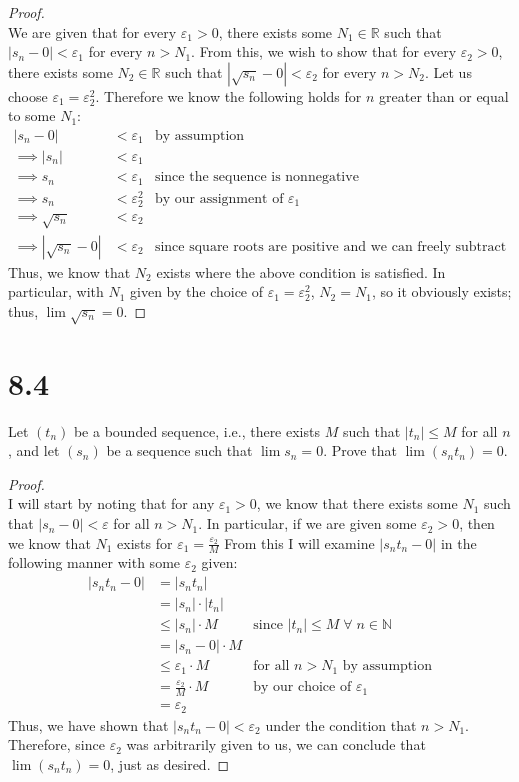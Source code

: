\documentclass[10pt,a4paper]{article}
\theoremstyle{definition}
\begin{document}
\begin{proof}{$ $}
\\We are given that for every $\varepsilon_1 > 0$, there exists some $N_1 \in \mathbb{R}$ such that $|s_n - 0| < \varepsilon_1$ for every $n > N_1$. From this, we wish to show that for every $\varepsilon_2 > 0$, there exists some $N_2 \in \mathbb{R}$ such that  $|\sqrt{s_n} - 0| < \varepsilon_2$ for every $n > N_2$. Let us choose $\varepsilon_1 = \varepsilon_2^2$. Therefore we know the following holds for $n$ greater than or equal to some $N_1$:
\begin{align*}
|s_n - 0| &< \varepsilon_1 &\text{by assumption}\\
\implies |s_n| &< \varepsilon_1\\
\implies s_n &< \varepsilon_1 &\text{since the sequence is nonnegative}\\
\implies s_n &< \varepsilon_2^2 &\text{by our assignment of } \varepsilon_1\\
\implies \sqrt{s_n} &< \varepsilon_2 \\
\implies |\sqrt{s_n} - 0| &< \varepsilon_2 &\text{since square roots are positive and we can freely subtract 0}
\end{align*}
Thus, we know that $N_2$ exists where the above condition is satisfied. In particular, with $N_1$ given by the choice of $\varepsilon_1 = \varepsilon_2^2$, $N_2 = N_1$, so it obviously exists; thus, $\lim \sqrt{s_n} = 0$.
\end{proof}

\section*{8.4}
Let $(t_n)$ be a bounded sequence, i.e., there exists $M$ such that $|t_n| \leq M$ for all $n$, and let $(s_n)$ be a sequence such that $\lim s_n = 0$. Prove that $\lim(s_n t_n) = 0$.

\begin{proof}{$ $}
\\I will start by noting that for any $\varepsilon_1 > 0$, we know that there exists some $N_1$ such that $|s_n - 0| < \varepsilon$ for all $n > N_1$. In particular, if we are given some $\varepsilon_2 > 0$, then we know that $N_1$ exists for $\displaystyle \varepsilon_1 = \frac{\varepsilon_2}{M}$ From this I will examine $|s_nt_n - 0|$ in the following manner with some $\varepsilon_2$ given:
\begin{align*}
|s_nt_n - 0| &= |s_nt_n|\\
&= |s_n|\cdot |t_n|\\
&\leq |s_n| \cdot M &\text{since } |t_n| \leq M \; \forall \; n \in \mathbb{N}\\
&= |s_n - 0| \cdot M\\
&\leq \varepsilon_1 \cdot M &\text{for all } n > N_1 \text{ by assumption}\\
&= \frac{\varepsilon_2}{M} \cdot M &\text{by our choice of } \varepsilon_1\\
&= \varepsilon_2
\end{align*}
Thus, we have shown that $|s_nt_n - 0| < \varepsilon_2$ under the condition that $n > N_1$. Therefore, since $\varepsilon_2$ was arbitrarily given to us, we can conclude that $\lim (s_nt_n) = 0$, just as desired. 
\end{proof}
\end{document}
